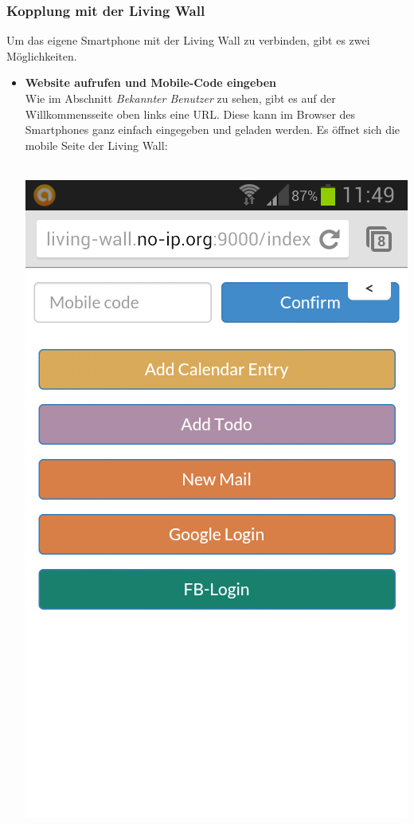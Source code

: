 \documentclass[10pt,a4paper]{report}
\begin{document}
		\subsubsection{Kopplung mit der Living Wall}
		Um das eigene Smartphone mit der Living Wall zu verbinden, gibt es zwei Möglichkeiten.
			\begin{itemize}
				\item \textbf{Website aufrufen und Mobile-Code eingeben}\\
				Wie im Abschnitt \textit{Bekannter Benutzer} zu sehen, gibt es auf der Willkommensseite oben links eine URL. Diese kann im Browser des Smartphones ganz einfach eingegeben und geladen werden. Es öffnet sich die mobile Seite der Living Wall:\\\\
				\begin{center}
					\includegraphics[scale=0.3, trim=0 8cm 0 0]{mobile}

\end{center}
\end{itemize}
\end{document}
